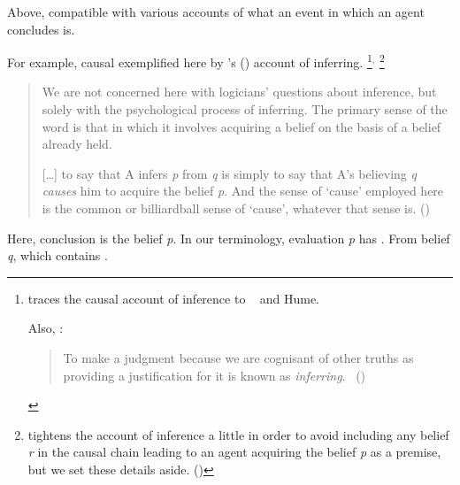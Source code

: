 \begin{note}
  Above, compatible with various accounts of what an event in which an agent concludes is.

  For example, causal exemplified here by \citeauthor{Armstrong:1968vh}'s (\citeyear{Armstrong:1968vh}) account of inferring.%
  \footnote{
    \citeauthor{Armstrong:1968vh} traces the causal account of inference to ~\citeauthor{Moore:1962up} and Hume.

    Also, \citeauthor{Frege:1979aa}:
    \begin{quote}
      To make a judgment because we are cognisant of other truths as providing a justification for it is known as \emph{inferring}.%
      \mbox{ }\hfill\mbox{(\cite{Frege:1979aa})}
    \end{quote}
  }\(^{,}\)%
  \footnote{
    \citeauthor{Armstrong:1968vh} tightens the account of inference a little in order to avoid including any belief \emph{r} in the causal chain leading to an agent acquiring the belief \emph{p} as a premise, but we set these details aside.
    (\citeyear[195--197]{Armstrong:1968vh})
  }

    \begin{quote}
    We are not concerned here with logicians' questions about inference, but solely with the psychological process of inferring.
    The primary sense of the word is that in which it involves acquiring a belief on the basis of a belief already held.

    [\dots] to say that A infers \emph{p} from \emph{q} is simply to say that A's believing \emph{q} \emph{causes} him to acquire the belief \emph{p}.
    And the sense of `cause' employed here is the common or billiardball sense of `cause', whatever that sense is.%
    \mbox{}\hfill\mbox{(\citeyear[194]{Armstrong:1968vh})}
  \end{quote}

  Here, conclusion is the belief \emph{p}.
  In our terminology, evaluation \emph{p} has  .
  From belief \emph{q}, \pool{} which contains .
\end{note}


